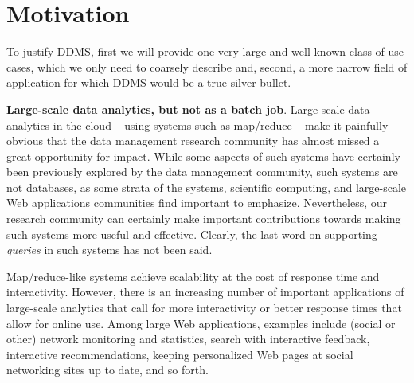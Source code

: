





\section{Motivation}


To justify DDMS, first we will provide one very large and well-known class of
use cases, which we only need to coarsely describe and, second, a more narrow
field of application for which DDMS would be a true silver bullet.




\medskip


{\bf Large-scale data analytics, but not as a batch job}\/.
%
Large-scale data analytics in the cloud -- using systems such as map/reduce --
make it painfully obvious that the data management research community has almost
missed a great opportunity for impact. While some aspects of such systems have
certainly been previously explored by the data management community, such
systems are not databases, as some strata of the systems, scientific computing,
and large-scale Web applications communities find important to emphasize.
Nevertheless, our research community can certainly make important contributions
towards making such systems more useful and effective. Clearly, the last word on
supporting {\em queries}\/ in such systems has not been said.


Map/reduce-like systems achieve scalability at the cost of response time and
interactivity.
%
%
However, there is an increasing number of important applications of large-scale
analytics that call for more interactivity or better response times that allow
for online use. Among large Web applications, examples include (social or other)
network monitoring and statistics, search with interactive feedback, interactive
recommendations, keeping personalized Web pages at social networking sites up to
date, and so forth.

